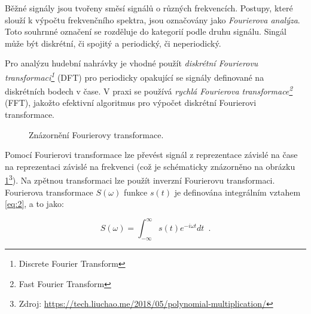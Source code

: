 \documentclass[thesis=B, czech]{FITthesis}[2019/03/06]
\begin{document}
Běžné signály jsou tvořeny směsí signálů o různých frekvencích. Postupy, které slouží k výpočtu frekvenčního spektra, jsou označovány jako \emph{Fourierova analýza}. Toto souhrnné označení se rozděluje do kategorií podle druhu signálu. Singál může být diskrétní, či spojitý a periodický, či neperiodický. 

Pro analýzu hudební nahrávky je vhodné použít \emph{diskrétní Fourierovu transformaci\footnote{Discrete Fourier Transform}} (DFT) pro periodicky opakující se signály definované na diskrétních bodech v čase. V praxi se používá \emph{rychlá Fourierova transformace\footnote{Fast Fourier Transform}} (FFT), jakožto efektivní algoritmus pro výpočet diskrétní Fourierovi transformace.

\begin{figure}[h]
\def\svgwidth{1\textwidth}
    \centering
    
        \caption[Fourierova transformace.]{
        Znázornění Fourierovy transformace.}
    \label{fig:fourier}
\end{figure}

Pomocí Fourierovi transformace lze převést signál z reprezentace závislé na čase na reprezentaci závislé na frekvenci (což je schématicky znázorněno na obrázku \ref{fig:fourier}\footnote{Zdroj: \url{https://tech.liuchao.me/2018/05/polynomial-multiplication/}}). Na zpětnou transformaci lze použít inverzní Fourierovu transformaci. Fourierova transformace $S(\omega )$
funkce $s(t)$ je definována integrálním vztahem \ref{eq:2}, a to jako:



\begin{equation} \label{eq:2}
    S(\omega ) = \int_{-\infty}^{\infty}{s(t)e^{-i\omega t}dt}\enspace .
\end{equation}





\newpage



\end{document}
